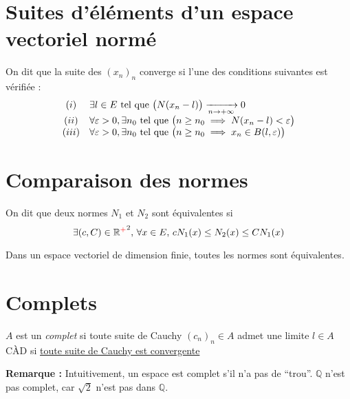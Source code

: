 \documentclass[11pt,a4paper,fleqn,pdftex]{report}
\begin{document}
\section{Suites d'éléments d'un espace vectoriel normé} %
\label{sec:suites_evn}
\begin{dfn}
    On dit que la suite des $(x_n)_n $ converge si l'une des conditions suivantes est vérifiée : 
    \begin{equation}
    \begin{array}{c l }
    (i) & \exists l \in E \text{ tel que } \big(N(x_n - l) \big) \xrightarrow[n\to +\infty]{} 0 \\
    (ii) & \forall \varepsilon > 0, \exists n_0 \text{ tel que } \big( n \geq n_0 \implies N(x_n - l) < \varepsilon \big) \\
    (iii) & \forall \varepsilon > 0, \exists n_0 \text{ tel que } \big( n \geq n_0 \implies x_n \in B(l,\varepsilon) \big)
    \end{array}
    \end{equation}
\end{dfn}
\section{Comparaison des normes} %
\label{sec:comparaison_des_normes}
\begin{dfn}
     On dit que deux normes $N_1$ et $N_2$ sont équivalentes si
     \begin{equation}
     \exists (c,C)\in {\mathbb{R}^{\textcolor{couleurImp}{+}}}^2,\, \forall x \in E,\, cN_1(x) \le N_2(x) \le CN_1(x)
     \end{equation}     
\end{dfn}
\begin{itheorem}
     Dans un espace vectoriel de dimension finie, toutes les normes sont équivalentes.
\end{itheorem}
\section{Complets} %
\label{sec:complets}
\begin{dfn}[Complet]
$A$ est un \emph{complet} si toute suite de Cauchy $(c_n)_n \in A$ admet une limite $l\in A$\\
CÀD si \uline{toute suite de Cauchy est convergente}
\end{dfn}
\textbf{Remarque :} Intuitivement, un espace est complet s'il n'a pas de \enquote{trou}. $\mathbb{Q}$ n'est pas complet, car $\sqrt{2}$ n'est pas dans $\mathbb{Q}$.
\end{document}
